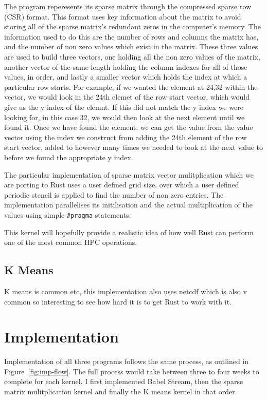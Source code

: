 The program reperesents its sparse matrix through the compressed sparse row (CSR) format. This format uses key information about the matrix to avoid storing all of the sparse matrix's redundant zeros in the computer's memory. The information used to do this are the number of rows and columns the matrix has, and the number of non zero values which exist in the matrix. These three values are used to build three vectors, one holding all the non zero values of the matrix, another vector of the same length holding the column indexes for all of those values, in order, and lastly a smaller vector which holds the index at which a particular row starts. For example, if we wanted the element at 24,32 within the vector, we would look in the 24th elemet of the row start vector, which would give us the y index of the elemnt. If this did not match the y index we were looking for, in this case 32, we would then look at the next element until we found it. Once we have found the element, we can get the value from the value vector using the index we construct from adding the 24th element of the row start vector, added to however many times we needed to look at the next value to before we found the appropriate y index.

The particular implementation of sparse matrix vector mulitplication which we are porting to Rust uses a user defined grid size, over which a user defined periodic stencil is applied to find the number of non zero entries. The implementation parallelises its initilisation and the actual multiplication of the values using simple \texttt{\#pragma} statements.

This kernel will hopefully provide a realistic idea of how well Rust can perform one of the most common HPC operations.

\subsection{K Means}

K means is common etc, this implementation also uses netcdf which is also v common so interesting to see how hard it is to get Rust to work with it.

\section{Implementation}
Implementation of all three programs follows the same process, as outlined in Figure~\ref{fig:imp-flow}. The full process would take between three to four weeks to complete for each kernel. I first implemented Babel Stream, then the sparse matrix mulitplication kernel and finally the K means kernel in that order.

